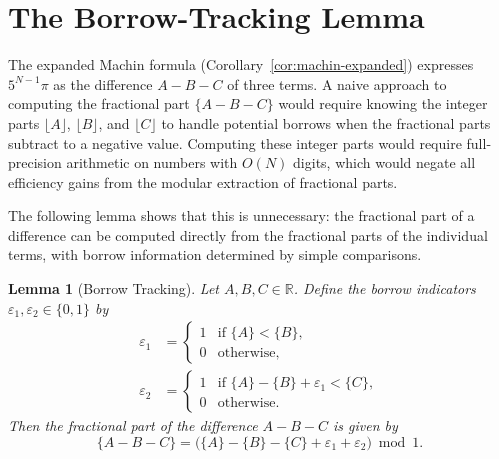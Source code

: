 \documentclass[11pt]{article}
\newtheorem{lemma}[theorem]{Lemma}
\begin{document}
\section{The Borrow-Tracking Lemma}

The expanded Machin formula (Corollary~\ref{cor:machin-expanded}) expresses $5^{N-1}\pi$ as the difference $A - B - C$ of three terms. A naive approach to computing the fractional part $\{A - B - C\}$ would require knowing the integer parts $\lfloor A \rfloor$, $\lfloor B \rfloor$, and $\lfloor C \rfloor$ to handle potential borrows when the fractional parts subtract to a negative value. Computing these integer parts would require full-precision arithmetic on numbers with $O(N)$ digits, which would negate all efficiency gains from the modular extraction of fractional parts.

The following lemma shows that this is unnecessary: the fractional part of a difference can be computed directly from the fractional parts of the individual terms, with borrow information determined by simple comparisons.

\begin{lemma}[Borrow Tracking]\label{lem:borrow}
Let $A, B, C \in \mathbb{R}$. Define the borrow indicators $\varepsilon_1, \varepsilon_2 \in \{0,1\}$ by
\begin{align}
\varepsilon_1 &= \begin{cases} 1 & \text{if } \{A\} < \{B\}, \\ 0 & \text{otherwise}, \end{cases} \label{eq:eps1}\\
\varepsilon_2 &= \begin{cases} 1 & \text{if } \{A\} - \{B\} + \varepsilon_1 < \{C\}, \\ 0 & \text{otherwise}. \end{cases} \label{eq:eps2}
\end{align}
Then the fractional part of the difference $A - B - C$ is given by
\begin{equation}\label{eq:borrow}
\{A - B - C\} = \bigl( \{A\} - \{B\} - \{C\} + \varepsilon_1 + \varepsilon_2 \bigr) \bmod 1.
\end{equation}
\end{lemma}
\end{document}
